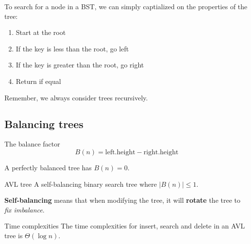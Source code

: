 To search for a node in a BST, we can simply captialized on the properties of the tree:
\begin{enumerate}
    \item Start at the root
    \item If the key is less than the root, go left
    \item If the key is greater than the root, go right
    \item Return if equal
\end{enumerate}
Remember, we always consider trees recursively.

\subsection{Balancing trees}

\begin{knBox}
    {The balance factor}
    \[B(n)=\text{left.height} - \text{right.height}\]

    A perfectly balanced tree has $B(n)=0$.
\end{knBox}

\begin{definition}
    {AVL tree}
    A self-balancing binary search tree where $|{B(n)}|\leq 1$.

    \textbf{Self-balancing} means that when modifying the tree, it will \textbf{rotate} the tree to \textit{fix imbalance}.
\end{definition}

\begin{theorem}
    {Time complexities}
    The time complexities for insert, search and delete in an AVL tree is $\Theta(\log n)$.
\end{theorem}

